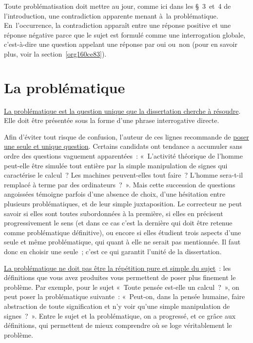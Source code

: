 \documentclass[a4paper,12pt]{report}
\begin{document}
Toute problématisation doit mettre au jour, comme ici dans les § 3 et 4
de l'introduction, une contradiction apparente menant à la
problématique. En l'occurrence, la contradiction apparaît entre une
réponse positive et une réponse négative parce que le sujet est formulé
comme une interrogation globale, c'est-à-dire une question appelant une
réponse par oui ou non (pour en savoir plus, voir la section \ref{org160ce83}).


\section{La problématique}
\label{sec:org172febd}

\uline{La problématique est la question unique que la dissertation cherche à
résoudre}. Elle doit être présentée sous la forme d'une phrase
interrogative directe.

Afin d'éviter tout risque de confusion, l'auteur de ces lignes
recommande de \uline{poser une seule et unique question}. Certains candidats
ont tendance a accumuler sans ordre des questions vaguement
apparentées : « L'activité théorique de l'homme peut-elle être simulée
tout entière par la simple manipulation de signes qui caractérise le
calcul ? Les machines peuvent-elles tout faire ? L'homme sera-t-il
remplacé à terme par des ordinateurs ? ». Mais cette succession de
questions angoissées témoigne parfois d'une absence de choix, d'une
hésitation entre plusieurs problématiques, et de leur simple
juxtaposition. Le correcteur ne peut savoir si elles sont toutes
subordonnées à la première, si elles en précisent progressivement le
sens (et dans ce cas c'est la dernière qui doit être retenue comme
problématique définitive), ou encore si elles étudient trois aspects
d'une seule et même problématique, qui quant à elle ne serait pas
mentionnée. Il faut donc en choisir une seule ; c'est ce qui garantit
l'unité de la dissertation.

\uline{La problématique ne doit pas être la répétition pure et simple du
sujet} : les définitions que vous avez produites vous permettent de
poser plus finement le problème. Par exemple, pour le sujet « Toute
pensée est-elle un calcul ? », on peut poser la problématique suivante :
« Peut-on, dans la pensée humaine, faire abstraction de toute
signification et n'y voir qu'une simple manipulation de signes ? ».
Entre le sujet et la problématique, on a progressé, et ce grâce aux
définitions, qui permettent de mieux comprendre où se loge véritablement
le problème.
\end{document}
